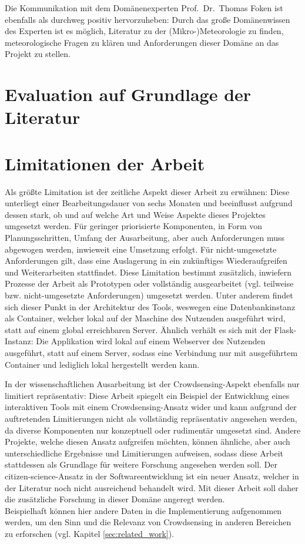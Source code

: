 Die Kommunikation mit dem Domänenexperten Prof.\ Dr.\ Thomas Foken ist ebenfalls als durchweg positiv hervorzuheben: Durch das große Domänenwissen des Experten ist es möglich, Literatur zu der (Mikro-)Meteorologie zu finden, meteorologische Fragen zu klären und Anforderungen dieser Domäne an das Projekt zu stellen.

\section{Evaluation auf Grundlage der Literatur}
\label{sec:evaluationliteratur}

\section{Limitationen der Arbeit}
\label{sec:limitations}
Als größte Limitation ist der zeitliche Aspekt dieser Arbeit zu erwähnen: Diese unterliegt einer Bearbeitungsdauer von sechs Monaten und beeinflusst aufgrund dessen stark, ob und auf welche Art und Weise Aspekte dieses Projektes umgesetzt werden. Für geringer priorisierte Komponenten, in Form von Planungsschritten, Umfang der Ausarbeitung, aber auch Anforderungen muss abgewogen werden, inwieweit eine Umsetzung erfolgt. Für nicht-umgesetzte Anforderungen gilt, dass eine Auslagerung in ein zukünftiges Wiederaufgreifen und Weiterarbeiten stattfindet. Diese Limitation bestimmt zusätzlich, inwiefern Prozesse der Arbeit als Prototypen oder vollständig ausgearbeitet (vgl. teilweise bzw. nicht-umgesetzte Anforderungen) umgesetzt werden. Unter anderem findet sich dieser Punkt in der Architektur des Tools, weswegen eine Datenbankinstanz als Container, welcher lokal auf der Maschine des Nutzenden ausgeführt wird, statt auf einem global erreichbaren Server. Ähnlich verhält es sich mit der Flask-Instanz: Die Applikation wird lokal auf einem Webserver des Nutzenden ausgeführt, statt auf einem Server, sodass eine Verbindung nur mit ausgeführtem Container und lediglich lokal hergestellt werden kann.

In der wissenschaftlichen Ausarbeitung ist der Crowdsensing-Aspekt ebenfalls nur limitiert repräsentativ: Diese Arbeit spiegelt ein Beispiel der Entwicklung eines interaktiven Tools mit einem Crowdsensing-Ansatz wider und kann aufgrund der auftretenden Limitierungen nicht als vollständig repräsentativ angesehen werden, da diverse Komponenten nur konzeptuell oder rudimentär umgesetzt sind. Andere Projekte, welche diesen Ansatz aufgreifen möchten, können ähnliche, aber auch unterschiedliche Ergebnisse und Limitierungen aufweisen, sodass diese Arbeit stattdessen als Grundlage für weitere Forschung angesehen werden soll. Der citizen-science-Ansatz in der Softwareentwicklung ist ein neuer Ansatz, welcher in der Literatur noch nicht ausreichend behandelt wird. Mit dieser Arbeit soll daher die zusätzliche Forschung in dieser Domäne angeregt werden. \\ Beispielhaft können hier andere Daten in die Implementierung aufgenommen werden, um den Sinn und die Relevanz von Crowdsensing in anderen Bereichen zu erforschen (vgl. Kapitel \ref{sec:related_work}).

